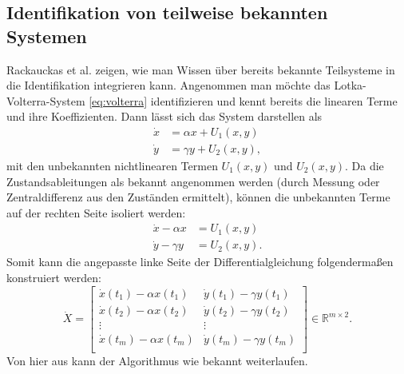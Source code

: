 \subsection{Identifikation von teilweise bekannten Systemen}
Rackauckas et al. \cite{Rackauckas2020} zeigen, wie man Wissen über bereits bekannte Teilsysteme in die Identifikation integrieren kann. Angenommen man möchte das Lotka-Volterra-System \eqref{eq:volterra} identifizieren und kennt bereits die linearen Terme und ihre Koeffizienten. Dann lässt sich das System darstellen als
\begin{equation}
	\begin{aligned}
		\dot{x} &= \alpha x + U_1(x,y)\\
		\dot{y} &= \gamma y + U_2(x,y),
	\end{aligned}
\end{equation}
mit den unbekannten nichtlinearen Termen $U_1(x,y)$ und $U_2(x,y)$. Da die Zustandsableitungen als bekannt angenommen werden (durch Messung oder Zentraldifferenz aus den Zuständen ermittelt), können die unbekannten Terme auf der rechten Seite isoliert werden:
\begin{equation}
	\begin{aligned}
		\dot{x} - \alpha x &= U_1(x,y)\\
		\dot{y} - \gamma y &= U_2(x,y).
	\end{aligned}
\end{equation}
Somit kann die angepasste linke Seite der Differentialgleichung folgendermaßen konstruiert werden:
\begin{equation}
\dot{X} = \begin{bmatrix} 
		\dot{x}(t_1)-\alpha x(t_1) & \dot{y}(t_1)-\gamma y(t_1) \\
		\dot{x}(t_2)-\alpha x(t_2) & \dot{y}(t_2)-\gamma y(t_2) \\
		\vdots 		   & \vdots 	 \\
		\dot{x}(t_m)-\alpha x(t_m) & \dot{y}(t_m)-\gamma y(t_m) \\
	\end{bmatrix}  \in \mathbb{R}^{m\times 2}.
\end{equation}
Von hier aus kann der Algorithmus wie bekannt weiterlaufen. 


